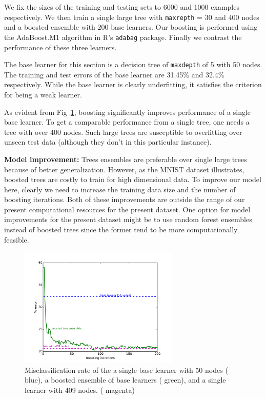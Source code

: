 \documentclass[10pt,letterpaper]{article}
\begin{document}
We fix the sizes of the training and testing sets to 6000 and 1000 examples respectively. We then train a single large tree with {\tt maxrepth} = 30 and 400 nodes and a boosted ensemble with 200 base learners. Our boosting is performed using the AdaBoost.M1 algorithm in R's {\tt adabag} package. Finally we contrast the performance of these three learners.  

The base learner for this section is a decision tree of {\tt maxdepth} of 5 with 50 nodes. The training and test errors of the base learner are 31.45\% and 32.4\% respectively. While the base learner is clearly underfitting, it satisfies the criterion for being a weak learner.  

As evident from Fig~\ref{boost1}, boosting significantly improves performance of a single base learner. To get a comparable performance from a single tree, one needs a tree with over 400 nodes. Such large trees are susceptible to overfitting over unseen test data (although they don't in this particular instance). 

{\bf Model improvement:} Trees ensembles are preferable over single large trees because of better generalization. However, as the MNIST dataset illustrates, boosted trees are costly to train for high dimensional data. To improve our model here, clearly we need to increase the training data size and the number of boosting iterations. Both of these improvements are outside the range of our present computational resources for the present dataset. One option for model improvements for the present dataset might be to use random forest ensembles instead of boosted trees since the former tend to be more computationally feasible. 
\begin{figure}[tbp]
	\begin{center}
	\includegraphics[width=3in]{../results/mnist/boosting/error_vs_boosting_iters.pdf}
	\end{center}
	\caption{Misclassification rate of the a single base learner with 50 nodes ({\color{blue} blue}), a boosted ensemble of base learners ({\color{green} green}), and a single learner with 409 nodes. ({\color{magenta} magenta}) \label{boost1}}
\end{figure}
\end{document}

